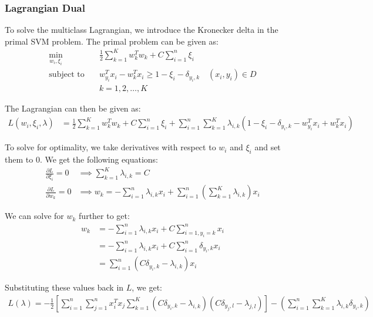 \documentclass[12pt]{article}
\begin{document}
\subsubsection{Lagrangian Dual}
To solve the multiclass Lagrangian, we introduce the Kronecker delta in the primal SVM problem. The primal problem can be given as:
\begin{align*}
    \min_{w_i, \xi_i} \quad &\frac{1}{2}\sum_{k=1}^{K}w_k^Tw_k + C\sum_{i=1}^{n}\xi_i \\
    \text{subject to} \quad &w_{y_i}^Tx_i - w_{k}^Tx_i \geq 1 - \xi_i - \delta_{y_i,k} \quad (x_i,y_i) \in D \\
    &k = 1, 2, \ldots, K
\end{align*}

The Lagrangian can then be given as:
\begin{align*}
    L(w_i, \xi_i, \lambda) &= \frac{1}{2}\sum_{k=1}^{K}w_k^Tw_k + C\sum_{i=1}^{n}\xi_i + \sum_{i=1}^{n}\sum_{k=1}^{K}\lambda_{i,k}(1 - \xi_i - \delta_{y_i,k} - w_{y_i}^Tx_i + w_{k}^Tx_i)
\end{align*}

To solve for optimality, we take derivatives with respect to $w_i$ and $\xi_i$ and set them to 0. We get the following equations:
\begin{align*}
    \frac{\partial L}{\partial \xi_i} = 0 &\implies \sum_{k=1}^{K} \lambda_{i,k} = C \\
    \frac{\partial L}{\partial w_k} = 0 &\implies w_k = - \sum_{i=1}^{n}\lambda_{i,k}x_i + \sum_{i=1}^{n} \left(\sum_{k=1}^{K} \lambda_{i,k}\right)x_i 
\end{align*}

We can solve for $w_k$ further to get:
\begin{align*}
    w_k &= - \sum_{i=1}^{n} \lambda_{i,k}x_i + C\sum_{i=1, y_i=k}^{n} x_i \\
    &= - \sum_{i=1}^{n} \lambda_{i,k}x_i + C\sum_{i=1}^{n} \delta_{y_i,k} x_i \\
    &= \sum_{i=1}^{n} (C \delta_{y_i,k} - \lambda_{i,k}) x_i
\end{align*}

Substituting these values back in $L$, we get:
\begin{align*}
    L(\lambda) = - \frac{1}{2} \left[\sum_{i=1}^{n} \sum_{j=1}^{n} x_i^T x_j \sum_{k=1}^{K} (C \delta_{y_i,k} - \lambda_{i,k})(C \delta_{y_j,l} - \lambda_{j,l})\right] - \left(\sum_{i=1}^{n} \sum_{k=1}^{K} \lambda_{i,k} \delta_{y_i,k}\right)
\end{align*}
\end{document}
